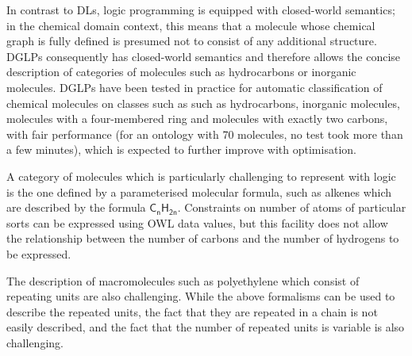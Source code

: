 \documentclass[10pt]{bmc_article}
\newenvironment{bmcformat}{\baselineskip20pt\sloppy\setboolean{publ}{false}}{\baselineskip20pt\sloppy}
\begin{document}
\begin{bmcformat}
In contrast to DLs, logic programming is equipped with closed-world semantics; in the chemical domain context, this means that a molecule whose chemical graph is fully defined is presumed not to consist of any additional structure. DGLPs \cite{magka2011} consequently has closed-world semantics and therefore allows the concise description of categories of molecules such as hydrocarbons or inorganic molecules. DGLPs have been tested in practice for automatic classification of chemical molecules on classes such as such as hydrocarbons, inorganic molecules, molecules with a four-membered ring and molecules with exactly two carbons, with fair performance (for an ontology with 70 molecules, no test took more than a few minutes), which is expected to further improve with optimisation. %

A category of molecules which is particularly challenging to represent with logic is the one defined by a parameterised molecular formula, such as alkenes which are described by the formula $\mathsf{C_nH_{2n}}$. Constraints on number of atoms of particular sorts can be expressed using OWL data values, but this facility does not allow the relationship between the number of carbons and the number of hydrogens to be expressed.  

The description of macromolecules such as polyethylene which consist of repeating units are also challenging. While the above formalisms can be used to describe the repeated units, the fact that they are repeated in a chain is not easily described, and the fact that the number of repeated units is variable is also challenging. %

% 




\end{bmcformat}
\end{document}
